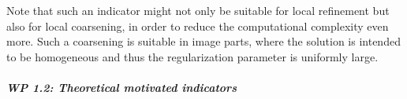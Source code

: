 \documentclass[enabledeprecatedfontcommands,cleardoublepage=empty,headsepline,twoside,11pt,DIV=15,BCOR=12mm,final]{scrartcl}
\begin{document}
Note that such an indicator might not only be suitable for local refinement but also for local coarsening, in order to reduce the computational complexity even more. Such a coarsening is suitable in image parts, where the solution is intended to be homogeneous and thus the regularization parameter is uniformly large.
 
 
 
 
 \subparagraph{WP 1.2: Theoretical motivated indicators}
 
\end{document}
